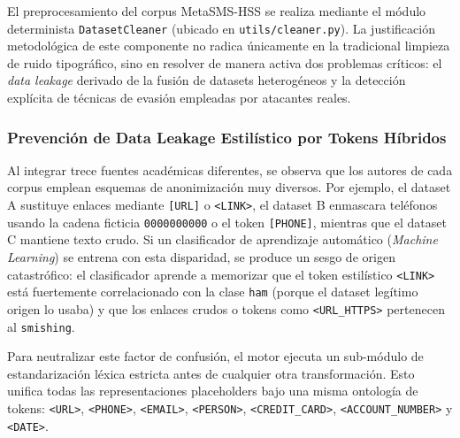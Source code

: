 El preprocesamiento del corpus MetaSMS-HSS se realiza mediante el módulo determinista \texttt{DatasetCleaner} (ubicado en \texttt{utils/cleaner.py}). La justificación metodológica de este componente no radica únicamente en la tradicional limpieza de ruido tipográfico, sino en resolver de manera activa dos problemas críticos: el \textit{data leakage} derivado de la fusión de datasets heterogéneos y la detección explícita de técnicas de evasión empleadas por atacantes reales.

\subsubsection{Prevención de Data Leakage Estilístico por Tokens Híbridos}
Al integrar trece fuentes académicas diferentes, se observa que los autores de cada corpus emplean esquemas de anonimización muy diversos. Por ejemplo, el dataset A sustituye enlaces mediante \texttt{[URL]} o \texttt{<LINK>}, el dataset B enmascara teléfonos usando la cadena ficticia \texttt{0000000000} o el token \texttt{[PHONE]}, mientras que el dataset C mantiene texto crudo. Si un clasificador de aprendizaje automático (\textit{Machine Learning}) se entrena con esta disparidad, se produce un sesgo de origen catastrófico: el clasificador aprende a memorizar que el token estilístico \texttt{<LINK>} está fuertemente correlacionado con la clase \texttt{ham} (porque el dataset legítimo origen lo usaba) y que los enlaces crudos o tokens como \texttt{<URL\_HTTPS>} pertenecen al \texttt{smishing}. 

Para neutralizar este factor de confusión, el motor ejecuta un sub-módulo de estandarización léxica estricta antes de cualquier otra transformación. Esto unifica todas las representaciones placeholders bajo una misma ontología de tokens: \texttt{<URL>}, \texttt{<PHONE>}, \texttt{<EMAIL>}, \texttt{<PERSON>}, \texttt{<CREDIT\_CARD>}, \texttt{<ACCOUNT\_NUMBER>} y \texttt{<DATE>}.

